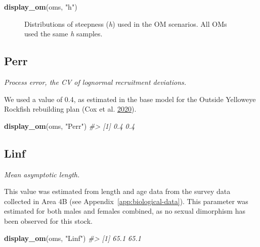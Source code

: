 \documentclass[11pt]{book}
\newenvironment{Shaded}{}{}
\newcommand{\KeywordTok}[1]{\textcolor[rgb]{0.00,0.44,0.13}{\textbf{{#1}}}}
\newcommand{\StringTok}[1]{\textcolor[rgb]{0.25,0.44,0.63}{{#1}}}
\newcommand{\CommentTok}[1]{\textcolor[rgb]{0.38,0.63,0.69}{\textit{{#1}}}}
\newcommand{\NormalTok}[1]{{#1}}
\newcommand{\OperatorTok}[1]{\textcolor[rgb]{0.00,0.44,0.13}{\textbf{{#1}}}}
\begin{document}
\begin{Shaded}
\end{Shaded}
\begin{Shaded}
\begin{Highlighting}[]
\KeywordTok{display_om}\NormalTok{(oms, }\StringTok{"h"}\NormalTok{)}
\end{Highlighting}
\end{Shaded}
\begin{figure}[htb]

{\centering {} 

}

\caption{Distributions of steepness (\emph{h}) used in the OM scenarios. All OMs used the same \emph{h} samples.}\label{fig:desc-stock-h-yelloweye}
\end{figure}
\label{app:desc-stock-perr-yelloweye}
\subsection{Perr}

\emph{Process error, the CV of lognormal recruitment deviations.}

We used a value of 0.4, as estimated in the base model for the Outside Yelloweye Rockfish rebuilding plan (Cox et al. \protect\hyperlink{ref-cox2020}{2020}).
\begin{Shaded}
\begin{Highlighting}[]
\KeywordTok{display_om}\NormalTok{(oms, }\StringTok{"Perr"}\NormalTok{)}
\CommentTok{#> [1] 0.4 0.4}
\end{Highlighting}
\end{Shaded}
\label{app:desc-stock-linf-yelloweye}
\subsection{Linf}

\emph{Mean asymptotic length.}

This value was estimated from length and age data from the survey data collected in Area 4B (see Appendix~\ref{app:biological-data}). This parameter was estimated for both males and females combined, as no sexual dimorphism has been observed for this stock.
\begin{Shaded}
\begin{Highlighting}[]
\KeywordTok{display_om}\NormalTok{(oms, }\StringTok{"Linf"}\NormalTok{)}
\CommentTok{#> [1] 65.1 65.1}
\end{Highlighting}
\end{Shaded}
\label{app:desc-stock-k-yelloweye}
\end{document}
